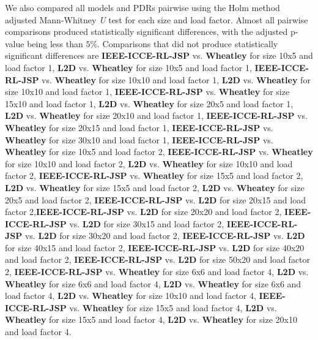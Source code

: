 We also compared all models and PDRs pairwise using the Holm method adjusted Mann-Whitney \textit{U} test \cite{mannwhitneyutest} for each size and load factor. Almost all pairwise comparisons produced statistically significant differences, with the adjusted p-value being less than $5\%$. Comparisons that did not produce statistically significant differences are \textbf{IEEE-ICCE-RL-JSP} vs. \textbf{Wheatley} for size 10x5 and load factor 1, \textbf{L2D} vs. \textbf{Wheatley} for size 10x5 and load factor 1, \textbf{IEEE-ICCE-RL-JSP} vs. \textbf{Wheatley} for size 10x10 and load factor 1, \textbf{L2D} vs. \textbf{Wheatley} for size 10x10 and load factor 1, \textbf{IEEE-ICCE-RL-JSP} vs. \textbf{Wheatley} for size 15x10 and load factor 1, \textbf{L2D} vs. \textbf{Wheatley} for size 20x5 and load factor 1, \textbf{L2D} vs. \textbf{Wheatley} for size 20x10 and load factor 1, \textbf{IEEE-ICCE-RL-JSP} vs. \textbf{Wheatley} for size 20x15 and load factor 1, \textbf{IEEE-ICCE-RL-JSP} vs. \textbf{Wheatley} for size 30x10 and load factor 1, \textbf{IEEE-ICCE-RL-JSP} vs. \textbf{Wheatley} for size 10x5 and load factor 2, \textbf{IEEE-ICCE-RL-JSP} vs. \textbf{Wheatley} for size 10x10 and load factor 2, \textbf{L2D} vs. \textbf{Wheatley} for size 10x10 and load factor 2, \textbf{IEEE-ICCE-RL-JSP} vs. \textbf{Wheatley} for size 15x5 and load factor 2, \textbf{L2D} vs. \textbf{Wheatley} for size 15x5 and load factor 2, \textbf{L2D} vs. \textbf{Wheatey} for size 20x5 and load factor 2, \textbf{IEEE-ICCE-RL-JSP} vs. \textbf{L2D} for size 20x15 and load factor 2,\textbf{IEEE-ICCE-RL-JSP} vs. \textbf{L2D} for size 20x20 and load factor 2, \textbf{IEEE-ICCE-RL-JSP} vs. \textbf{L2D} for size 30x15 and load factor 2, \textbf{IEEE-ICCE-RL-JSP} vs. \textbf{L2D} for size 30x20 and load factor 2, \textbf{IEEE-ICCE-RL-JSP} vs. \textbf{L2D} for size 40x15 and load factor 2, \textbf{IEEE-ICCE-RL-JSP} vs. \textbf{L2D} for size 40x20 and load factor 2, \textbf{IEEE-ICCE-RL-JSP} vs. \textbf{L2D} for size 50x20 and load factor 2, \textbf{IEEE-ICCE-RL-JSP} vs. \textbf{Wheatley} for size 6x6 and load factor 4, \textbf{L2D} vs. \textbf{Wheatley} for size 6x6 and load factor 4, \textbf{L2D} vs. \textbf{Wheatley} for size 6x6 and load factor 4, \textbf{L2D} vs. \textbf{Wheatley} for size 10x10 and load factor 4, \textbf{IEEE-ICCE-RL-JSP} vs. \textbf{Wheatley} for size 15x5 and load factor 4, \textbf{L2D} vs. \textbf{Wheatley} for size 15x5 and load factor 4, \textbf{L2D} vs. \textbf{Wheatley} for size 20x10 and load factor 4.


